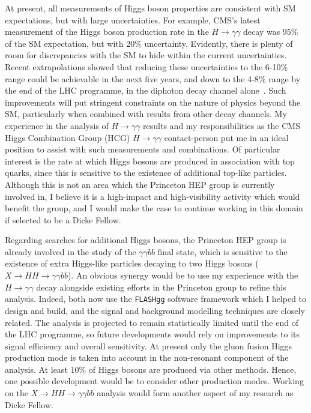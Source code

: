 \documentclass[11pt,a4paper,sans]{moderncv}        %
\begin{document}
At present, all measurements of Higgs boson properties are consistent with SM expectations, but with large uncertainties. For example, CMS's latest measurement of the Higgs boson production rate in the $H \rightarrow \gamma \gamma$ decay was 95\% of the SM expectation, but with 20\% uncertainty. Evidently, there is plenty of room for discrepancies with the SM to hide within the current uncertainties. Recent extrapolations showed that reducing these uncertainties to the 6-10\% range could be achievable in the next five years, and down to the 4-8\% range by the end of the LHC programme, in the diphoton decay channel alone~\cite{CMS-DP-2016-064}. Such improvements will put stringent constraints on the nature of physics beyond the SM, particularly when combined with results from other decay channels. My experience in the analysis of $H \rightarrow \gamma \gamma$ results and my responsibilities as the CMS Higgs Combination Group (HCG)  $H \rightarrow \gamma \gamma$ contact-person put me in an ideal position to assist with such measurements and combinations. Of particular interest is the rate at which Higgs bosons are produced in association with top quarks, since this is sensitive to the existence of additional top-like particles. Although this is not an area which the Princeton HEP group is currently involved in, I believe it is a high-impact and high-visibility activity which would benefit the group, and I would make the case to continue working in this domain if selected to be a Dicke Fellow. 

Regarding searches for additional Higgs bosons, the Princeton HEP group is already involved in the study of the $ \gamma \gamma bb$ final state, which is sensitive to the existence of extra Higgs-like particles decaying to two Higgs bosons ($X \rightarrow HH \rightarrow \gamma \gamma bb$). An obvious synergy would be to use my experience with the $H \rightarrow \gamma \gamma$ decay alongside existing efforts in the Princeton group to refine this analysis. Indeed, both now use the \texttt{FLASHgg} software framework which I helped to design and build, and the signal and background modelling techniques are closely related. The analysis is projected to remain statistically limited until the end of the LHC programme, so future developments would rely on improvements to its signal efficiency and overall sensitivity. At present only the gluon fusion Higgs production mode is taken into account in the non-resonant component of the analysis. At least 10\% of Higgs bosons are produced via other methods. Hence, one possible development  would be to consider other production modes. Working on the $X \rightarrow HH \rightarrow \gamma \gamma bb$ analysis would form another aspect of my research as Dicke Fellow.
\end{document}
